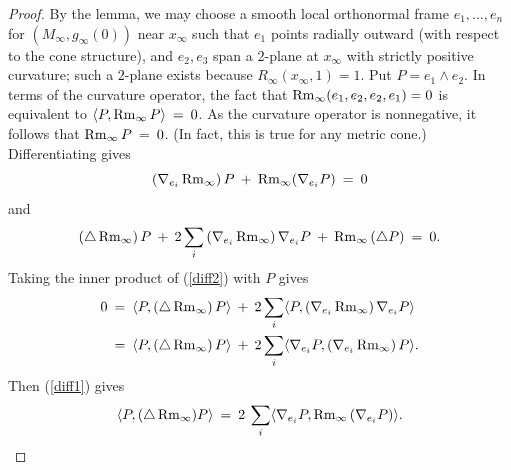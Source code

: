 \begin{proof}
By the lemma, we may choose a smooth local orthonormal
frame $e_1,\ldots,e_n$ for $(M_\infty,g_\infty(0))$
near $x_\infty$ such that $e_1$ points radially outward (with respect to the
cone structure), and $e_2,e_3$ span a $2$-plane at $x_\infty$ with strictly
positive curvature;
such a $2$-plane exists because $R_\infty(x_\infty, 1) = 1$.
Put $P = e_1 \wedge e_2$.
In terms of the curvature operator, the fact that
$\operatorname{Rm}_\infty(e_1,e_2,e_2,e_1)=0$ is equivalent to
$\langle P, \operatorname{Rm}_\infty P \rangle \: = \: 0$.
As the curvature operator is nonnegative, it follows that
$\operatorname{Rm}_\infty P \: = \: 0$. (In fact, this is true for any metric cone.)
Differentiating gives
\begin{equation} \label{diff1}
\left( \nabla_{e_i} \operatorname{Rm}_\infty \right) P \: + \: \operatorname{Rm}_\infty (\nabla_{e_i} P) \: = \: 0
\end{equation}
and
\begin{equation} \label{diff2}
\left( \triangle \operatorname{Rm}_\infty \right) P \: + \: 2 \sum_i \left( \nabla_{e_i} \operatorname{Rm}_\infty \right)
\nabla_{e_i} P \: + \: \operatorname{Rm}_\infty \left( \triangle P \right) \: = \: 0.
\end{equation}
Taking the inner product of (\ref{diff2}) with $P$ gives
\begin{align}
0 \: & = \: \langle P, \left( \triangle \operatorname{Rm}_\infty \right) P \rangle  \: + \: 2 \sum_i
\langle P, \left( \nabla_{e_i} \operatorname{Rm}_\infty \right)
\nabla_{e_i} P \rangle \\
& = \: \langle P, \left( \triangle \operatorname{Rm}_\infty \right) P \rangle  \: + \: 2 \sum_i
\langle \nabla_{e_i} P, \left( \nabla_{e_i} \operatorname{Rm}_\infty \right)
P \rangle. \notag
\end{align}
Then  (\ref{diff1}) gives
\begin{equation}
\langle P, (\triangle \operatorname{Rm}_\infty) P \rangle \: = \:  2 \:
\sum_i \langle \nabla_{e_i} P,  \operatorname{Rm}_\infty \left( \nabla_{e_i} P \right)  \rangle.
\end{equation}


\end{proof}
